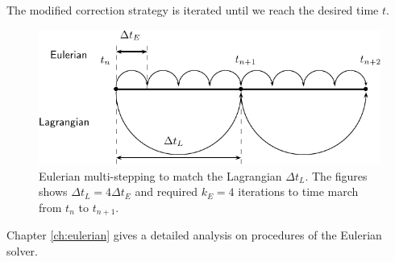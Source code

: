 The modified correction strategy is iterated until we reach the desired time $t$.

	\begin{figure}[!t]
	\centering
	\includegraphics[width=0.7\linewidth]{./figures/eulerian/multiStep-crop.pdf}
	\caption{Eulerian multi-stepping to match the Lagrangian $\Delta t_L$. The figures shows $\Delta t_L = 4 \Delta t_E$ and required $k_E = 4$ iterations to time march from $t_n$ to $t_{n+1}$.}
	\label{fig:multiStep}
	\end{figure}


Chapter \ref{ch:eulerian} gives a detailed analysis on procedures of the Eulerian solver.
